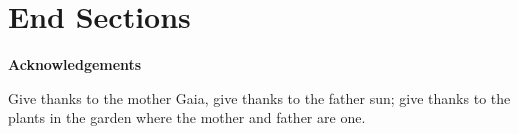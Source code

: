 \documentclass[12pt,a4paper,twoside]{book}
\begin{document}
\part{End Sections}
\pagestyle{plain}
\begin{footnotesize}
\printbibliography
\end{footnotesize}
\newpage
\listoffigures
{}
\listoftables
{}
\newpage
\vspace*{1.5cm}
\begin{flushright}
\begin{minipage}{.9\textwidth}
{\bf \LARGE\hfill\color{reddy}  Acknowledgements} \vspace{20 pt}\\
Give thanks to the mother Gaia, give thanks to the father sun; give thanks to the plants in the garden where the mother and father are one.
\end{minipage}
\end{flushright}
\end{document}

